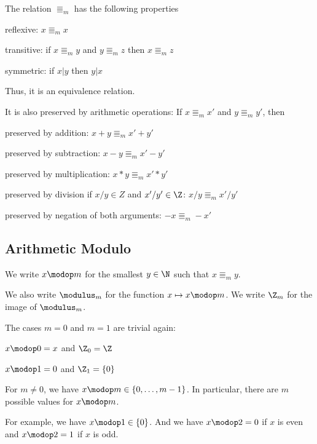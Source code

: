 \begin{theorem}[Modulo]\label{thm:modulo}
The relation $\Equiv_m$ has the following properties
\begin{compactitem}
\item reflexive: $x\Equiv_m x$
\item transitive: if $x\Equiv_m y$ and $y\Equiv_m z$ then $x\Equiv_m z$
\item symmetric: if $x|y$ then $y|x$
\end{compactitem}
Thus, it is an equivalence relation.
\medskip

It is also preserved by arithmetic operations: If $x\Equiv_m x'$ and $y\Equiv_m y'$, then
\begin{compactitem}
\item preserved by addition: $x+y\Equiv_m x'+y'$
\item preserved by subtraction: $x-y\Equiv_m x'-y'$
\item preserved by multiplication: $x*y\Equiv_m x'*y'$
\item preserved by division if $x/y\in Z$ and $x'/y'\in \Z$: $x/y\Equiv_m x'/y'$
\item preserved by negation of both arguments: $-x\Equiv_m -x'$
\end{compactitem}
\end{theorem}

\subsection{Arithmetic Modulo}\label{sec:math:moduloarith}

\begin{definition}[Modulus]\label{def:math:modulofun}
 We write $x\modop m$ for the smallest $y\in\N$ such that $x\Equiv_m y$.
 
 We also write $\modulus_m$ for the function $x\mapsto x\modop m$.
 We write $\Z_m$ for the image of $\modulus_m$.
\end{definition}

\begin{remark}
The cases $m=0$ and $m=1$ are trivial again:
\begin{compactitem}
\item $x\modop 0=x$ and $\Z_0=\Z$
\item $x\modop 1=0$ and $\Z_1=\{0\}$
\end{compactitem}
\end{remark}

\begin{remark}
For $m\neq 0$, we have $x\modop m\in \{0,\ldots,m-1\}$.
In particular, there are $m$ possible values for $x\modop m$.

For example, we have $x\modop 1\in \{0\}$.
And we have $x\modop 2=0$ if $x$ is even and $x\modop 2=1$ if $x$ is odd.
\end{remark}

